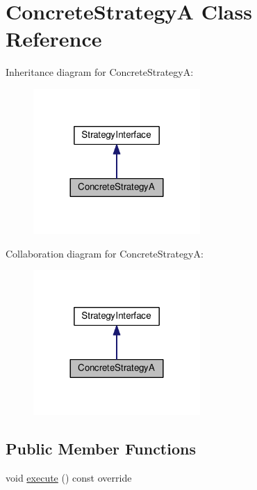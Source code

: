 \hypertarget{classConcreteStrategyA}{}\section{Concrete\+StrategyA Class Reference}
\label{classConcreteStrategyA}


Inheritance diagram for Concrete\+StrategyA\+:
\nopagebreak
\begin{figure}[H]
\begin{center}
\leavevmode
\includegraphics[width=180pt]{classConcreteStrategyA__inherit__graph}
\end{center}
\end{figure}


Collaboration diagram for Concrete\+StrategyA\+:
\nopagebreak
\begin{figure}[H]
\begin{center}
\leavevmode
\includegraphics[width=180pt]{classConcreteStrategyA__coll__graph}
\end{center}
\end{figure}
\subsection*{Public Member Functions}
\begin{DoxyCompactItemize}
\item 
void \hyperlink{classConcreteStrategyA_aa9f7351ab4bfa87a2ccdef4e73813f10}{execute} () const override
\end{DoxyCompactItemize}


